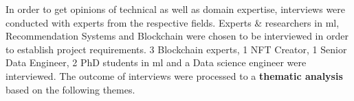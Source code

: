 In order to get opinions of technical as well as domain expertise, interviews were conducted with experts from the respective fields. Experts \& researchers in \gls{ml}, Recommendation Systems and Blockchain were chosen to be interviewed in order to establish project requirements. 3 Blockchain experts, 1 NFT Creator, 1 Senior Data Engineer, 2 PhD students in \gls{ml} and a Data science engineer were interviewed.
The outcome of interviews were processed to a \textbf{thematic analysis} based on the following themes.


